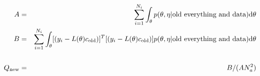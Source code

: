 \documentclass{article}
\begin{document}
\begin{eqnarray}
A
&=&
\sum_{i=1}^{N_i}
\int_\theta
p(\theta,\eta|\mbox{old everything and data})
{\rm d} \theta
\\
B
&=&
\sum_{i=1}^{N_i}
\int_\theta
[
(y_i - L(\theta) c_{\rm old})
]^T
[
(y_i - L(\theta) c_{\rm old})
]
p(\theta,\eta|\mbox{old everything and data})
{\rm d} \theta
\nonumber\\
\\
Q_{\rm new}
&=&
B/(A N_a^2)
\end{eqnarray}
\end{document}
